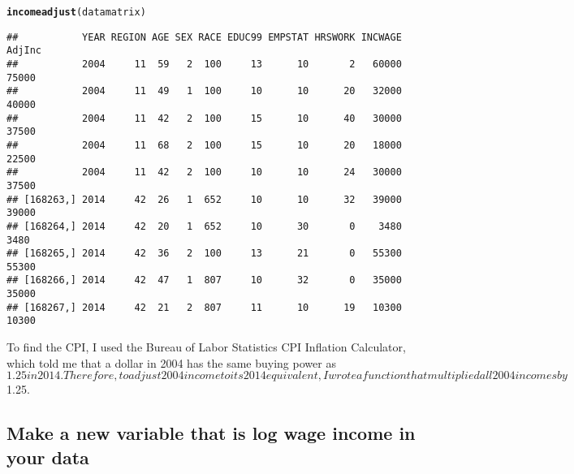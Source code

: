 \documentclass{article}\usepackage[]{graphicx}\usepackage[]{color}
\makeatletter
\newcommand{\hlstd}[1]{\textcolor[rgb]{0.345,0.345,0.345}{#1}}%
\newcommand{\hlkwd}[1]{\textcolor[rgb]{0.737,0.353,0.396}{\textbf{#1}}}%
\newenvironment{kframe}{%
 \def\at@end@of@kframe{}%
 \ifinner\ifhmode%
  \def\at@end@of@kframe{\end{minipage}}%
  \begin{minipage}{\columnwidth}%
 \fi\fi%
 \def\FrameCommand##1{\hskip\@totalleftmargin \hskip-\fboxsep
 \colorbox{shadecolor}{##1}\hskip-\fboxsep
     \hskip-\linewidth \hskip-\@totalleftmargin \hskip\columnwidth}%
 \MakeFramed {\advance\hsize-\width
   \@totalleftmargin\z@ \linewidth\hsize
   \@setminipage}}%
 {\par\unskip\endMakeFramed%
 \at@end@of@kframe}
\newenvironment{knitrout}{}{} %
\makeatother
\begin{document}
\begin{knitrout}
\begin{kframe}
\begin{alltt}
\hlkwd{incomeadjust}\hlstd{(datamatrix)}
\end{alltt}
\begin{verbatim}
##           YEAR REGION AGE SEX RACE EDUC99 EMPSTAT HRSWORK INCWAGE AdjInc
##           2004     11  59   2  100     13      10       2   60000  75000
##           2004     11  49   1  100     10      10      20   32000  40000
##           2004     11  42   2  100     15      10      40   30000  37500
##           2004     11  68   2  100     15      10      20   18000  22500
##           2004     11  42   2  100     10      10      24   30000  37500
## [168263,] 2014     42  26   1  652     10      10      32   39000  39000
## [168264,] 2014     42  20   1  652     10      30       0    3480   3480
## [168265,] 2014     42  36   2  100     13      21       0   55300  55300
## [168266,] 2014     42  47   1  807     10      32       0   35000  35000
## [168267,] 2014     42  21   2  807     11      10      19   10300  10300
\end{verbatim}
\end{kframe}
\end{knitrout}

To find the CPI, I used the Bureau of Labor Statistics CPI Inflation Calculator, which told me that a dollar in 2004 has the same buying power as $1.25 in 2014. Therefore, to adjust 2004 income to its 2014 equivalent, I wrote a function that multiplied all 2004 incomes by $1.25.

\subsection{Make a new variable that is log wage income in your data}
\end{document}

